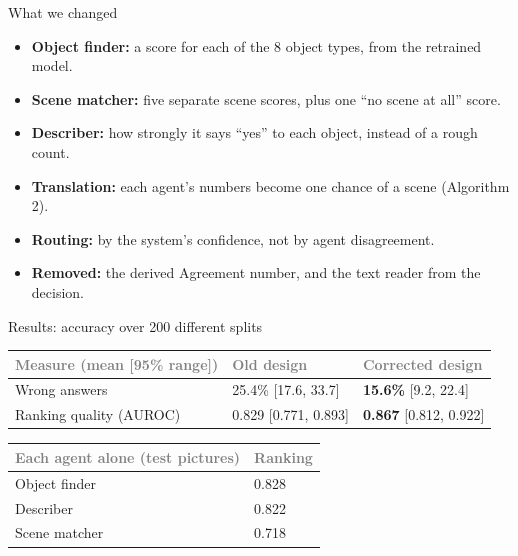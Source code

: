 \documentclass[aspectratio=169,11pt]{beamer}
\newcommand{\h}[1]{\textcolor{grey}{#1}}
\newcommand{\remark}[1]{\par\vspace{0.35cm}{\small\textcolor{grey}{#1}}}
\begin{document}
\begin{frame}{What we changed}
\begin{itemize}\setlength\itemsep{8pt}
  \item \textbf{Object finder:} a score for each of the 8 object types, from the retrained model.
  \item \textbf{Scene matcher:} five separate scene scores, plus one ``no scene at all'' score.
  \item \textbf{Describer:} how strongly it says ``yes'' to each object, instead of a rough count.
  \item \textbf{Translation:} each agent's numbers become one chance of a scene (Algorithm 2).
  \item \textbf{Routing:} by the system's confidence, not by agent disagreement.
  \item \textbf{Removed:} the derived Agreement number, and the text reader from the decision.
\end{itemize}
\end{frame}

\begin{frame}{Results: accuracy over 200 different splits}
\begin{tabular}{@{}L{4.6cm} C{3.8cm} C{3.8cm}@{}}
\toprule
\h{Measure (mean [95\% range])} & \h{Old design} & \h{Corrected design}\\
\midrule
Wrong answers & 25.4\% [17.6, 33.7] & \textbf{15.6\%} [9.2, 22.4]\\
Ranking quality (AUROC) & 0.829 [0.771, 0.893] & \textbf{0.867} [0.812, 0.922]\\
\bottomrule
\end{tabular}

\vspace{0.4cm}
\begin{tabular}{@{}L{4.6cm} C{3.8cm}@{}}
\toprule
\h{Each agent alone (test pictures)} & \h{Ranking}\\
\midrule
Object finder & 0.828\\
Describer & 0.822\\
Scene matcher & 0.718\\
\bottomrule
\end{tabular}
\remark{Each split puts different books into practice, calibration and test, so one lucky split cannot decide the result.}
\end{frame}
\end{document}
